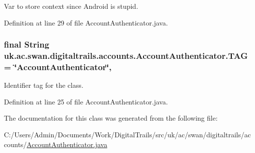 Var to store context since Android is stupid. 



Definition at line 29 of file Account\+Authenticator.\+java.

\hypertarget{classuk_1_1ac_1_1swan_1_1digitaltrails_1_1accounts_1_1_account_authenticator_a39113e1c1faaa9b9629e1c07f56e1a83}{
\subsubsection[{T\+A\+G}]{\setlength{\rightskip}{0pt plus 5cm}final String uk.\+ac.\+swan.\+digitaltrails.\+accounts.\+Account\+Authenticator.\+T\+A\+G = \char`\"{}Account\+Authenticator\char`\"{}\hspace{0.3cm}{\ttfamily [static]}, {\ttfamily [private]}}}\label{classuk_1_1ac_1_1swan_1_1digitaltrails_1_1accounts_1_1_account_authenticator_a39113e1c1faaa9b9629e1c07f56e1a83}


Identifier tag for the class. 



Definition at line 25 of file Account\+Authenticator.\+java.



The documentation for this class was generated from the following file\+:\begin{DoxyCompactItemize}
\item 
C\+:/\+Users/\+Admin/\+Documents/\+Work/\+Digital\+Trails/src/uk/ac/swan/digitaltrails/accounts/\hyperlink{_account_authenticator_8java}{Account\+Authenticator.\+java}\end{DoxyCompactItemize}
